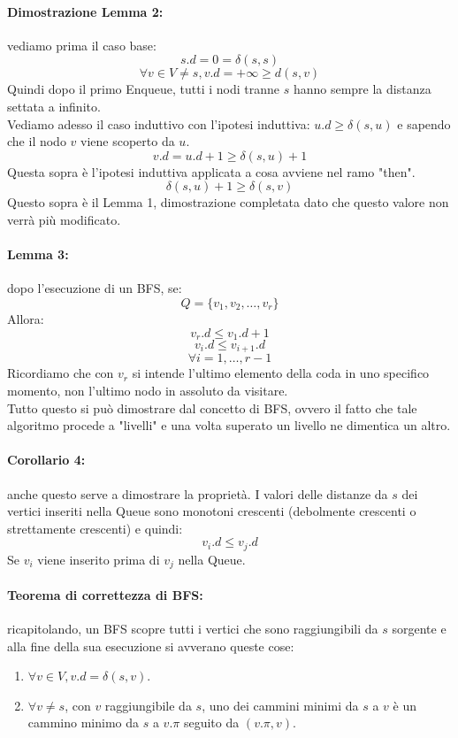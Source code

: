 \documentclass[a4paper,12pt]{article}
\begin{document}
\paragraph{Dimostrazione Lemma 2:} vediamo prima il caso base:
\[
s.d = 0 = \delta(s,s)
\]
\[
\forall v \in V \ne s, v.d = +\infty \geq d(s,v)
\]
Quindi dopo il primo Enqueue, tutti i nodi tranne $s$ hanno sempre la distanza settata a infinito.\\
Vediamo adesso il caso induttivo con l'ipotesi induttiva: $u.d \geq \delta(s,u)$ e sapendo che il nodo $v$ viene scoperto da $u$.
\[
v.d = u.d + 1 \geq \delta(s,u) + 1
\]
Questa sopra è l'ipotesi induttiva applicata a cosa avviene nel ramo "then".
\[
\delta(s,u) + 1 \geq \delta(s,v)
\]
Questo sopra è il Lemma 1, dimostrazione completata dato che questo valore non verrà più modificato.
\paragraph{Lemma 3:} dopo l'esecuzione di un BFS, se:
\[
Q = \{v_1,v_2,\ldots,v_r\}
\]
Allora:
\[
v_r.d \leq v_1.d + 1
\]
\[
v_i.d \leq v_{i+1}.d
\]
\[
\forall i = 1,\ldots,r-1
\]  
Ricordiamo che con $v_r$ si intende l'ultimo elemento della coda in uno specifico momento, non l'ultimo nodo in assoluto da visitare.\\
Tutto questo si può dimostrare dal concetto di BFS, ovvero il fatto che tale algoritmo procede a "livelli" e una volta superato un livello ne dimentica un altro.
\paragraph{Corollario 4:} anche questo serve a dimostrare la proprietà. I valori delle distanze da $s$ dei vertici inseriti nella Queue sono monotoni crescenti (debolmente crescenti o strettamente crescenti) e quindi:
\[
v_i.d \leq v_j.d
\]
Se $v_i$ viene inserito prima di $v_j$ nella Queue.
\paragraph{Teorema di correttezza di BFS:} ricapitolando, un BFS scopre tutti i vertici che sono raggiungibili da $s$ sorgente e alla fine della sua esecuzione si avverano queste cose:
\begin{enumerate}
    \item $\forall v \in V, v.d = \delta(s,v)$.
    \item $\forall v \ne s$, con $v$ raggiungibile da $s$, uno dei cammini minimi da $s$ a $v$ è un cammino minimo da $s$ a $v.\pi$ seguito da $(v.\pi,v)$.
\end{enumerate}
\end{document}
